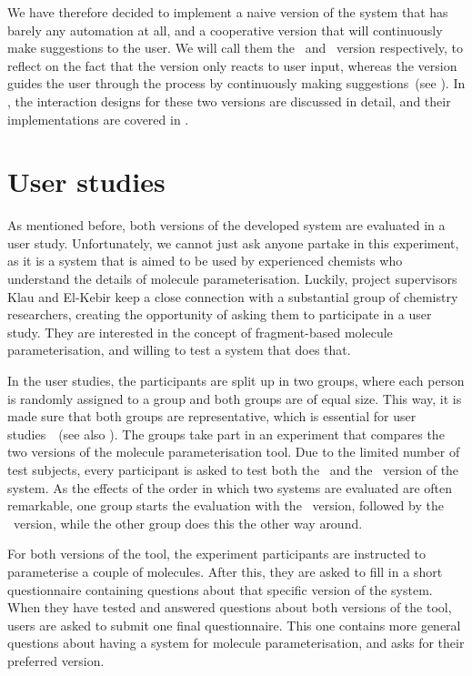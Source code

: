 We have therefore decided to implement a naive version of the system that has barely any automation at all, and a cooperative version that will continuously make suggestions to the user. We will call them the \IDa\ and \IDb\ version respectively, to reflect on the fact that the \IDa version only reacts to user input, whereas the \IDb version guides the user through the process by continuously making suggestions~(see ). In , the interaction designs for these two versions are discussed in detail, and their implementations are covered in .



\section{User studies}
As mentioned before, both versions of the developed system are evaluated in a user study. Unfortunately, we cannot just ask anyone partake in this experiment, as it is a system that is aimed to be used by experienced chemists who understand the details of molecule parameterisation. Luckily, project supervisors Klau and El-Kebir keep a close connection with a substantial group of chemistry researchers, creating the opportunity of asking them to participate in a user study. They are interested in the concept of fragment-based molecule parameterisation, and willing to test a system that does that.

In the user studies, the participants are split up in two groups, where each person is randomly assigned to a group and both groups are of equal size. This way, it is made sure that both groups are representative, which is essential for user studies~\cite{wohlin2003empirical}~(see also ). The groups take part in an experiment that compares the two versions of the molecule parameterisation tool. Due to the limited number of test subjects, every participant is asked to test both the \IDa\ and the \IDb\ version of the system. As the effects of the order in which two systems are evaluated are often remarkable, one group starts the evaluation with the \IDa\ version, followed by the \IDb\ version, while the other group does this the other way around.

For both versions of the tool, the experiment participants are instructed to parameterise a couple of molecules. After this, they are asked to fill in a short questionnaire containing questions about that specific version of the system. When they have tested and answered questions about both versions of the tool, users are asked to submit one final questionnaire. This one contains more general questions about having a system for molecule parameterisation, and asks for their preferred version.

